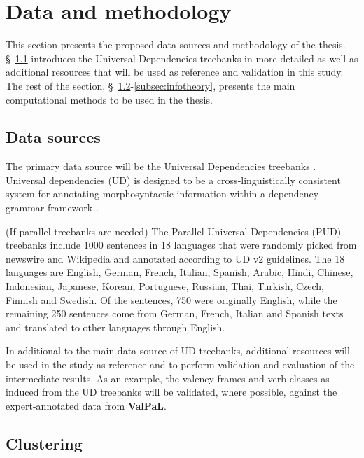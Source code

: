 \section{Data and methodology}

This section presents the proposed data sources and methodology of the thesis. \S~\ref{subsec:data-sources} introduces the Universal Dependencies treebanks in more detailed as well as additional resources that will be used as reference and validation in this study. The rest of the section, \S~\ref{subsec:clustering}-\ref{subsec:infotheory}, presents the main computational methods to be used in the thesis.

\subsection{Data sources}\label{subsec:data-sources}

The primary data source will be the Universal Dependencies treebanks \citep{universaldep}. Universal dependencies (UD) is designed to be a cross-linguistically consistent system for annotating morphosyntactic information within a dependency grammar framework \citep{demarneffe2021}.

(If parallel treebanks are needed) The Parallel Universal Dependencies (PUD) treebanks \citep{zeman2017} include 1000 sentences in 18 languages that were randomly picked from newswire and Wikipedia and annotated according to UD v2 guidelines. The 18 languages are English, German, French, Italian, Spanish, Arabic, Hindi, Chinese, Indonesian, Japanese, Korean, Portuguese, Russian, Thai, Turkish, Czech, Finnish and Swedish. Of the sentences, 750 were originally English, while the remaining 250 sentences come from German, French, Italian and Spanish texts and translated to other languages through English.


In additional to the main data source of UD treebanks, additional resources will be used in the study as reference and to perform validation and evaluation of the intermediate results. As an example, the valency frames and verb classes as induced from the UD treebanks will be validated, where possible, against the expert-annotated data from \textbf{ValPaL}\citep{valpal}. 

\subsection{Clustering}\label{subsec:clustering}

